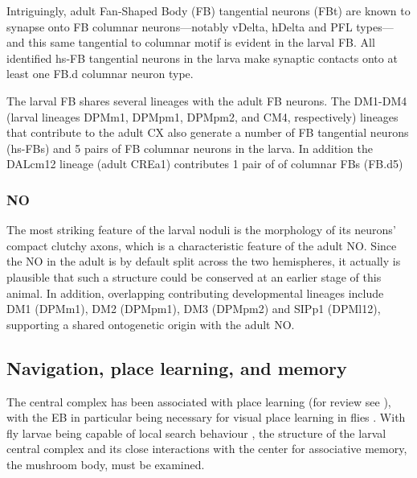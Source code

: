         Intriguingly, adult Fan‑Shaped Body (FB) tangential neurons (FBt) are known to synapse onto FB columnar neurons—notably vDelta, hDelta and PFL types—and this same tangential to columnar motif is evident in the larval FB. All identified hs‑FB tangential neurons in the larva make synaptic contacts onto at least one FB.d columnar neuron type.

        The larval FB shares several lineages with the adult FB neurons. The DM1-DM4 (larval lineages DPMm1, DPMpm1, DPMpm2, and CM4, respectively)  lineages that contribute to the adult CX also generate a number of FB tangential neurons (hs-FBs) and 5 pairs of FB columnar neurons in the larva. In addition the DALcm12 lineage (adult CREa1) contributes 1 pair of of columnar FBs (FB.d5)

        \subsubsection{NO}
        The most striking feature of the larval noduli is the morphology of its neurons' compact clutchy axons, which is a characteristic feature of the adult NO. Since the NO in the adult is by default split across the two hemispheres, it actually is plausible that such a structure could be conserved at an earlier stage of this animal.  In addition, overlapping contributing developmental lineages include DM1 (DPMm1), DM2 (DPMpm1), DM3 (DPMpm2) and SIPp1 (DPMl12), supporting a shared ontogenetic origin with the adult NO.



\subsection{Navigation, place learning, and memory}

The central complex has been associated with place learning (for review see \citep{PfeifferHomberg2014}), with the EB in particular being necessary for visual place learning in flies \citep{ofstad2011visual}. With fly larvae being capable of local search behaviour \citep{kromp2024localsearch}, the structure of the larval central complex and its close interactions with the center for associative memory, the mushroom body, must be examined.

